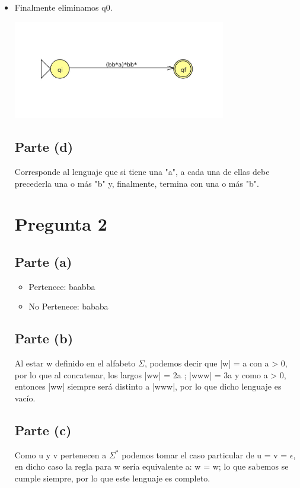 \documentclass[11pt,letterpaper]{article}
\begin{document}
\begin{itemize}
\begin{center}
\end{center}
\item{Finalmente eliminamos q0.}
\begin{center}
\includegraphics[height=4.3cm]{tarea1-c4.png}
\end{center}

\subsection{Parte (d)}
Corresponde al lenguaje que si tiene una "a", a cada una de ellas debe precederla una o más "b" y, finalmente, termina con una o más "b".

\section{Pregunta 2}
\subsection{Parte (a)}
\begin{itemize}
\item{Pertenece: baabba}
\item{No Pertenece: bababa}
\end{itemize}
\subsection{Parte (b)}
Al estar w definido en el alfabeto $\Sigma$, podemos decir que |w| = a con a > 0, por lo que al concatenar, los largos |ww| = 2a ; |www| = 3a y como a > 0, entonces |ww| siempre será distinto a |www|, por lo que dicho lenguaje es vacío.
\subsection{Parte (c)}
Como u y v pertenecen a $\Sigma ^*$ podemos tomar el caso particular de u = v = $\epsilon$, en dicho caso la regla para w sería equivalente a: w = w; lo que sabemos se cumple siempre, por lo que este lenguaje es completo.


\end{itemize}
\end{document}
